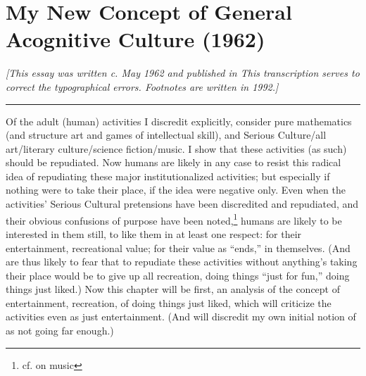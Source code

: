 \chapter{My New Concept of General Acognitive Culture (1962)}

{\itshape [This essay was written c. May 1962 and published in  This transcription serves to correct the typographical errors. Footnotes are written in 1992.]}

\plainbreak{2}

Of the adult (human) activities I discredit explicitly, consider pure mathematics (and structure art and games of intellectual skill), and Serious Culture\slash all art\slash literary culture\slash science fiction\slash music. I show that these activities (as such) should be repudiated. Now humans are likely in any case to resist this radical idea of repudiating these major institutionalized activities; but especially if nothing were to take their place, if the idea were negative only. Even when the activities' Serious Cultural pretensions have been discredited and repudiated, and their obvious confusions of purpose have been noted,\footnote{cf.  on music} humans are likely to be interested in them still, to like them in at least one respect: for their entertainment, recreational value; for their value as \enquote{ends,} in themselves. (And are thus likely to fear that to repudiate these activities without anything's taking their place would be to give up all recreation, doing things \enquote{just for fun,} doing things just liked.) Now this chapter will be first, an analysis of the concept of entertainment, recreation, of doing things just liked, which will criticize the activities even as just entertainment. (And will discredit my own initial notion of  as not going far enough.)

